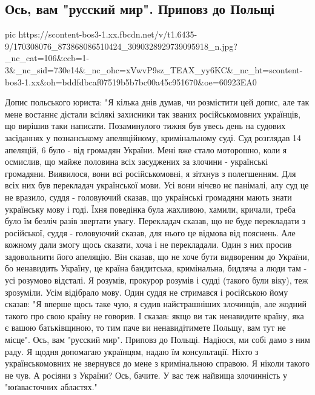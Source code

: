  
 
 
 
 

\subsection{Ось, вам "русский мир". Приповз до Польщі}

\ifcmt
  pic https://scontent-bos3-1.xx.fbcdn.net/v/t1.6435-9/170308076_873868086510424_3090328929739095918_n.jpg?_nc_cat=106&ccb=1-3&_nc_sid=730e14&_nc_ohc=xVwvP9sz_TEAX_yy6KC&_nc_ht=scontent-bos3-1.xx&oh=bddfdbcaf07519b5b7bc00a45c951670&oe=60923EA0
\fi

Допис польського юриста:
"Я кілька днів думав, чи розмістити цей допис, але так мене востаннє дістали всілякі захисники так званих російськомовних українців, що вирішив таки написати.
Позаминулого тижня був увесь день на судових засіданнях у познанському апеляційному, кримінальному суді. Суд розглядав 14 апеляцій, 6 було - від громадян України. Мені вже стало моторошно, коли я осмислив, що майже половина всіх засуджених за злочини - українські громадяни.
Виявилося, вони всі російськомовні, я зітхнув з полегшенням.
Для всіх них був перекладач української мови.
Усі вони нічєво нє панімалі, алу суд це не вразило, суддя - головуючий сказав, що українські громадяни мають знати українську мову і годі.
Їхня поведінка була жахливою, хамили, кричали, треба було їм безліч разів звертати увагу. Перекладач сказав, що не буде перекладати з російської, суддя - головуючий сказав, для нього це відмова від пояснень. Але кожному дали змогу щось сказати, хоча і не перекладали.
Один з них просив задовольнити його апеляцію. Він сказав, що не хоче бути видвореним до України, бо ненавидить Україну, це країна бандитська, кримінальна, бидляча а люди там - усі розумово відсталі.
Я розумів, прокурор розумів і судді (такого були віку), теж зрозуміли. Усім відібрало мову.
Один суддя не стримався і російською йому сказав: "Я вперше щось таке чую, я судив найстрашніших злочинців, але жодний такого про свою країну не говорив. І сказав: якщо ви так ненавидите країну, яка є вашою батьківщиною, то тим паче ви ненавидітимете Польщу, вам тут не місце".
Ось, вам "русский мир". Приповз до Польщі. Надіюся, ми собі дамо з ним раду.
Я щодня допомагаю українцям, надаю їм консультації. Ніхто з українськомовних не звернувся до мене з кримінальною справою. Я ніколи такого не чув. А росіяни з України? Ось, бачите.
У вас теж найвища злочинність у "юґавасточних абластях."
